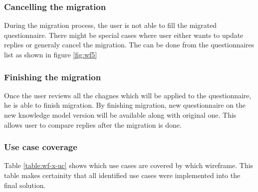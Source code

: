 

\subsubsection*{Cancelling the migration}

During the migration process, the user is not able to fill the migrated questionnaire.
There might be special cases where user either wants to update replies or generaly cancel the migration.
The can be done from the questionnaires list as shown in figure \ref{fig:wf5}


\subsubsection*{Finishing the migration}

Once the user reviews all the chagnes which will be applied to the questionnaire, he is able to finish migration.
By finishing migration, new questionnaire on the new knowledge model version will be available along with original one.
This allows user to compare replies after the migration is done.


\subsubsection*{Use case coverage}

Table \ref{table:wf-x-uc} shows which use cases are covered by which wireframe.
This table makes certainity that all identified use cases were implemented into the final solution.

